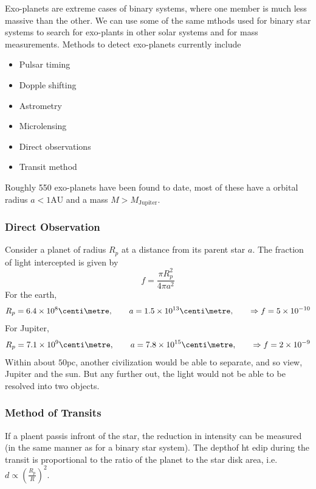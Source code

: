 \documentclass[british]{article}
\begin{document}
Exo-planets are extreme cases of binary systems, where one member is much less massive than the other. We can use some of the same mthods used for binary star systems to search for exo-plants in other solar systems and for mass measurements. Methods to detect exo-planets currently include
\begin{itemize}
	\item Pulsar timing
	\item Dopple shifting
	\item Astrometry
	\item Microlensing
	\item Direct observations
	\item Transit method
\end{itemize}
Roughly 550 exo-planets have been found to date, most of these have a orbital radius $a<1 \text{AU}$ and a mass $M>M_{\text{Jupiter}}$.

\subsubsection{Direct Observation}
Consider a planet of radius $R_p$ at a distance from its parent star $a$. The fraction of light intercepted is given by
\[
	f = \frac{\pi R_p^2}{4\pi a^2}
\]
For the earth,
\[
	R_p=6.4\times 10^8\centi\metre, \qquad a=1.5\times 10^{13}\centi\metre, \qquad \Rightarrow f= 5\times 10^{-10}
\]
For Jupiter,
\[
	R_p=7.1\times 10^9\centi\metre, \qquad a=7.8\times 10^{15}\centi\metre, \qquad \Rightarrow f= 2\times 10^{-9}
\]
Within about $50$pc, another civilization would be able to separate, and so view, Jupiter and the sun. But any further out, the light would not be able to be resolved into two objects.

\subsubsection{Method of Transits}
If a plaent passis infront of  the star, the reduction in intensity can be measured (in the same manner as for a binary star system). The depthof ht edip during the transit is proportional to the ratio of the planet to the star disk area, i.e.\ $d \propto \left(\frac{R_p}{R}\right)^2$.
\end{document}

